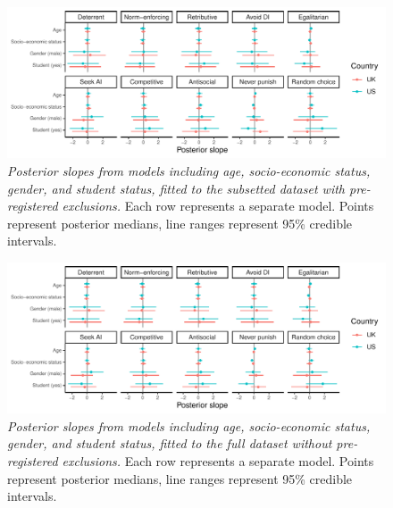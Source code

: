 \documentclass[
  man,floatsintext]{apa6}
\begin{document}
\begin{figure}
\centering
\includegraphics{manuscript_files/figure-latex/plotAllDems2-1.pdf}
\caption{\label{fig:plotAllDems2}\emph{Posterior slopes from models including age,
socio-economic status, gender, and student status, fitted to the subsetted
dataset with pre-registered exclusions.} Each row represents a separate model.
Points represent posterior medians, line ranges represent 95\% credible intervals.}
\end{figure}

\newpage






\begin{figure}
\centering
\includegraphics{manuscript_files/figure-latex/plotAllDems1-1.pdf}
\caption{\label{fig:plotAllDems1}\emph{Posterior slopes from models including age,
socio-economic status, gender, and student status, fitted to the full dataset
without pre-registered exclusions.} Each row represents a separate model. Points
represent posterior medians, line ranges represent 95\% credible intervals.}
\end{figure}

\newpage
\end{document}
